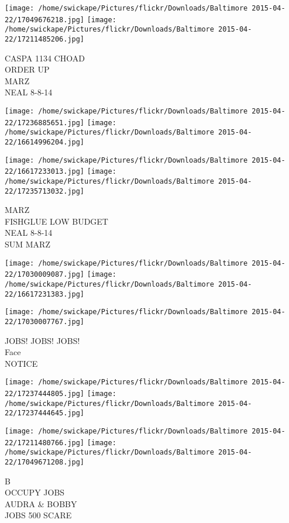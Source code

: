 \documentclass[10pt,letterpaper]{article}
\begin{document}
\texttt{[image: /home/swickape/Pictures/flickr/Downloads/Baltimore 2015-04-22/17049676218.jpg]}
\texttt{[image: /home/swickape/Pictures/flickr/Downloads/Baltimore 2015-04-22/17211485206.jpg]}

CASPA 1134 CHOAD\\
ORDER UP\\
MARZ\\
NEAL 8{-}8{-}14\\
\pagebreak

\texttt{[image: /home/swickape/Pictures/flickr/Downloads/Baltimore 2015-04-22/17236885651.jpg]}
\texttt{[image: /home/swickape/Pictures/flickr/Downloads/Baltimore 2015-04-22/16614996204.jpg]}

\texttt{[image: /home/swickape/Pictures/flickr/Downloads/Baltimore 2015-04-22/16617233013.jpg]}
\texttt{[image: /home/swickape/Pictures/flickr/Downloads/Baltimore 2015-04-22/17235713032.jpg]}

MARZ\\
FISHGLUE LOW BUDGET\\
NEAL 8{-}8{-}14\\
SUM MARZ\\
\pagebreak

\texttt{[image: /home/swickape/Pictures/flickr/Downloads/Baltimore 2015-04-22/17030009087.jpg]}
\texttt{[image: /home/swickape/Pictures/flickr/Downloads/Baltimore 2015-04-22/16617231383.jpg]}

\vspace{0.25in}
\texttt{[image: /home/swickape/Pictures/flickr/Downloads/Baltimore 2015-04-22/17030007767.jpg]}

JOBS!  JOBS!  JOBS!\\
Face\\
NOTICE\\
\pagebreak

\texttt{[image: /home/swickape/Pictures/flickr/Downloads/Baltimore 2015-04-22/17237444805.jpg]}
\texttt{[image: /home/swickape/Pictures/flickr/Downloads/Baltimore 2015-04-22/17237444645.jpg]}

\texttt{[image: /home/swickape/Pictures/flickr/Downloads/Baltimore 2015-04-22/17211480766.jpg]}
\texttt{[image: /home/swickape/Pictures/flickr/Downloads/Baltimore 2015-04-22/17049671208.jpg]}

B\\
OCCUPY JOBS\\
AUDRA \& BOBBY\\
JOBS 500 SCARE\\
\pagebreak
\end{document}
